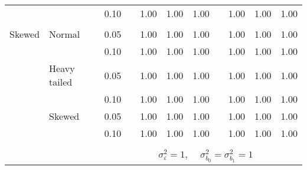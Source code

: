 \begin{table}[ht]
\begin{scriptsize}
\begin{tabular}{ll p{.1cm} c p{.1cm} rrr p{.1cm} rrr}
             &              && 0.10 &&  1.00 & 1.00 & 1.00 && 1.00 & 1.00 & 1.00 \\ 
             &&&&&&&&&&&\\
Skewed       & Normal       && 0.05 &&  1.00 & 1.00 & 1.00 && 1.00 & 1.00 & 1.00 \\ 
             &              && 0.10 &&  1.00 & 1.00 & 1.00 && 1.00 & 1.00 & 1.00 \\ 
             & Heavy tailed && 0.05 &&  1.00 & 1.00 & 1.00 && 1.00 & 1.00 & 1.00 \\ 
             &              && 0.10 &&  1.00 & 1.00 & 1.00 && 1.00 & 1.00 & 1.00 \\ 
             & Skewed       && 0.05 &&  1.00 & 1.00 & 1.00 && 1.00 & 1.00 & 1.00 \\ 
             &              && 0.10 &&  1.00 & 1.00 & 1.00 && 1.00 & 1.00 & 1.00 \\ 

&&&&&&&&&&&\\
& && && \multicolumn{6}{c}{$\sigma_{\varepsilon}^2 = 1$, \ \ $\sigma_{b_0}^2 = \sigma_{b_1}^2 = 1$} \\ \cline{6-12}


\end{tabular}
\end{scriptsize}
\end{table}
